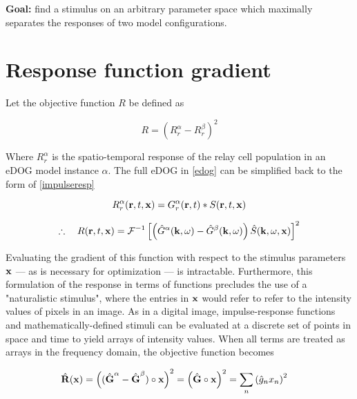 \documentclass{article}
\newcommand{\vect}[1]{\textbf{\textrm{#1}}}
\begin{document}
\begin{center}
\begin{minipage}{0.8\textwidth}
	\textbf{Goal:} find a stimulus on an arbitrary parameter space which maximally separates 	
	the responses of two model configurations.
\end{minipage}
\end{center}


\section{Response function gradient} \label{responsegradient}
Let the objective function $R$ be defined as

\begin{equation}
	R = (R_{r}^{\alpha} - R_{r}^{\beta})^2
\end{equation}

Where $R_{r}^{\alpha}$ is the spatio-temporal response of the relay cell population in an eDOG model instance $\alpha$. 
The full eDOG in \eqref{edog} can be simplified back to the form of \eqref{impulseresp}

\begin{equation*}
	R_{r}^{\alpha}(\vect{r},t,\vect{x}) = G_{r}^{\alpha}(\vect{r},t)*S(\vect{r},t,\vect{x}) 
\end{equation*}

\begin{equation} \label{objfunc}
	\therefore \quad R(\vect{r}, t, \vect{x}) = \mathcal{F}^{-1} \left[ 
	\left(\hat{G}^{\alpha}(\vect{k}, \omega) - \hat{G}^{\beta}(\vect{k}, \omega)\right)
	\hat{S}(\vect{k}, \omega, \vect{x}) \right]^2 
\end{equation}

Evaluating the gradient of this function with respect to the stimulus parameters $\vect{x}$ --- as is necessary for optimization --- is intractable.
Furthermore, this formulation of the response in terms of functions precludes the use of a "naturalistic stimulus", where the entries in $\vect{x}$ would refer to refer to the intensity values of pixels in an image.
As in a digital image, impulse-response functions and mathematically-defined stimuli can be evaluated at a discrete set of points in space and time to yield arrays of intensity values.
When all terms are treated as arrays in the frequency domain, the objective function becomes

\begin{align} \label{objmat}
	\hat{\vect{R}}(\vect{x}) & = \left( (\hat{\vect{G}}^\alpha - \hat{\vect{G}}^\beta) \circ 
						   		  \vect{x} \right)^2 = 
						   		  \left( \hat{\vect{G}} \circ  \vect{x} \right)^2 = 
						   		  \sum_n{\left( \hat{g}_n x_n \right)^2}
\end{align}
\end{document}
